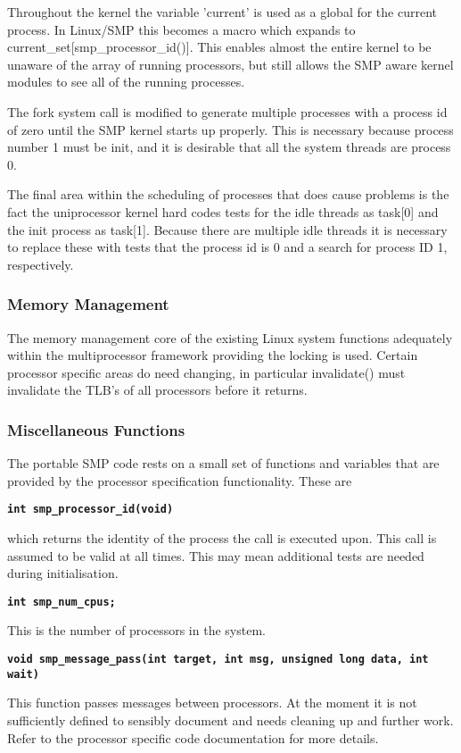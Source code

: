 \documentclass[]{article}
\begin{document}
Throughout the kernel the variable 'current' is used as a global for the 
current process. In Linux/SMP this becomes a macro which expands to 
current\_set[smp\_processor\_id()]. This enables almost the entire kernel to 
be unaware of the array of running processors, but still allows the SMP 
aware kernel modules to see all of the running processes.

The fork system call is modified to generate multiple processes with a 
process id of zero until the SMP kernel starts up properly. This is 
necessary because process number 1 must be init, and it is desirable that 
all the system threads are process 0. 

The final area within the scheduling of processes that does cause problems 
is the fact the uniprocessor kernel hard codes tests for the idle threads 
as task[0] and the init process as task[1]. Because there are multiple idle 
threads it is necessary to replace these with tests that the process id is 
0 and a search for process ID 1, respectively.

\subsubsection{Memory Management}
The memory management core of the existing Linux system functions 
adequately within the multiprocessor framework providing the locking is 
used. Certain processor specific areas do need changing, in particular 
invalidate() must invalidate the TLB's of all processors before it returns.


\subsubsection{Miscellaneous Functions}
The portable SMP code rests on a small set of functions and variables 
that are provided by the processor specification functionality. These are

{\tt \bf int smp\_processor\_id(void) }

which returns the identity of the process the call is executed upon. This 
call is assumed to be valid at all times. This may mean additional tests 
are needed during initialisation.


{\tt \bf int smp\_num\_cpus;}

This is the number of processors in the system. \

{\tt \bf void smp\_message\_pass(int target, int msg, unsigned long data,
		int wait)}

This function passes messages between processors. At the moment it is not 
sufficiently defined to sensibly document and needs cleaning up and further 
work. Refer to the processor specific code documentation for more details.
\end{document}
